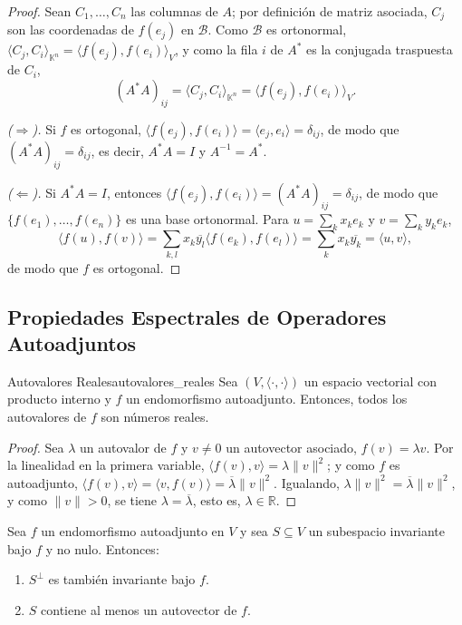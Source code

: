 \documentclass[11pt, a4paper]{article}
\begin{document}
\begin{proof}
Sean $C_1, \dots, C_n$ las columnas de $A$; por definición de matriz asociada, $C_j$ son las coordenadas de $f(e_j)$ en $\mathcal{B}$. Como $\mathcal{B}$ es ortonormal, $\langle C_j, C_i \rangle_{\mathbb{K}^n} = \langle f(e_j), f(e_i) \rangle_V$, y como la fila $i$ de $A^*$ es la conjugada traspuesta de $C_i$,
\[ (A^* A)_{ij} = \langle C_j, C_i \rangle_{\mathbb{K}^n} = \langle f(e_j), f(e_i) \rangle_V. \]

\textit{($\Rightarrow$).} Si $f$ es ortogonal, $\langle f(e_j), f(e_i) \rangle = \langle e_j, e_i \rangle = \delta_{ij}$, de modo que $(A^* A)_{ij} = \delta_{ij}$, es decir, $A^* A = I$ y $A^{-1} = A^*$.

\textit{($\Leftarrow$).} Si $A^* A = I$, entonces $\langle f(e_j), f(e_i) \rangle = (A^* A)_{ij} = \delta_{ij}$, de modo que $\{f(e_1), \dots, f(e_n)\}$ es una base ortonormal. Para $u = \sum_k x_k e_k$ y $v = \sum_k y_k e_k$,
\[ \langle f(u), f(v) \rangle = \sum_{k,l} x_k \overline{y_l} \langle f(e_k), f(e_l) \rangle = \sum_k x_k \overline{y_k} = \langle u, v \rangle, \]
de modo que $f$ es ortogonal.
\end{proof}

\subsection{Propiedades Espectrales de Operadores Autoadjuntos}

\begin{teorema}{Autovalores Reales}{autovalores_reales}
Sea $(V, \langle \cdot, \cdot \rangle)$ un espacio vectorial con producto interno y $f$ un endomorfismo autoadjunto.
Entonces, todos los autovalores de $f$ son números reales.
\end{teorema}

\begin{proof}
Sea $\lambda$ un autovalor de $f$ y $v \neq 0$ un autovector asociado, $f(v) = \lambda v$. Por la linealidad en la primera variable, $\langle f(v), v \rangle = \lambda \|v\|^2$; y como $f$ es autoadjunto, $\langle f(v), v \rangle = \langle v, f(v) \rangle = \overline{\lambda} \|v\|^2$. Igualando, $\lambda \|v\|^2 = \overline{\lambda} \|v\|^2$, y como $\|v\| > 0$, se tiene $\lambda = \overline{\lambda}$, esto es, $\lambda \in \mathbb{R}$.
\end{proof}

\begin{lema}\label{lema_invariancia}
Sea $f$ un endomorfismo autoadjunto en $V$ y sea $S \subseteq V$ un subespacio invariante bajo $f$ y no nulo. Entonces:
\begin{enumerate}
    \item[i)] $S^\perp$ es también invariante bajo $f$.
    \item[ii)] $S$ contiene al menos un autovector de $f$.
\end{enumerate}
\end{lema}
\end{document}
